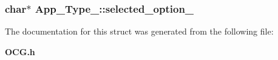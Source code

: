 \subsubsection[{selected\_\-option\_\-}]{\setlength{\rightskip}{0pt plus 5cm}char$\ast$ {\bf App\_\-Type\_\-::selected\_\-option\_\-}}\label{structApp__Type___d7d9c27bf54840facce9c22d2da685fb}




The documentation for this struct was generated from the following file:\begin{CompactItemize}
\item 
{\bf OCG.h}\end{CompactItemize}
